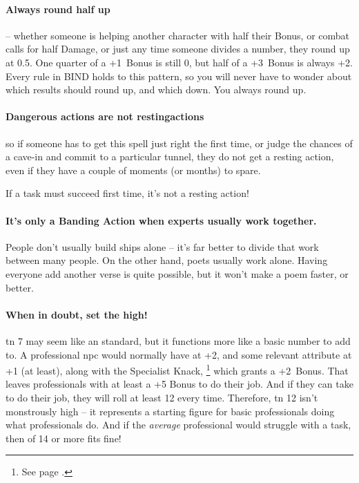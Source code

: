 \begin{multicols}{2}
\begin{scriptsize}
\begin{boxtable}[clXX]
\end{boxtable}
\end{scriptsize}

\paragraph{Always round half up} -- whether someone is helping another character with half their Bonus, or combat calls for half Damage, or just any time someone divides a number, they round up at 0.5.
One quarter of a +1~Bonus is still 0, but half of a +3~Bonus is always +2.
Every rule in BIND holds to this pattern, so you will never have to wonder about which results should round up, and which down.
You always round up.

\paragraph{Dangerous actions are not \glspl{restingaction}}
so if someone has to get this spell just right the first time, or judge the chances of a cave-in and commit to a particular tunnel, they do not get a resting action, even if they have a couple of moments (or months) to spare.

If a task must succeed first time, it's not a resting action!

\paragraph{It's only a Banding Action when experts usually work together.}
People don't usually build ships alone -- it's far better to divide that work between many people.
On the other hand, poets usually work alone.
Having everyone add another verse is quite possible, but it won't make a poem faster, or better.

\paragraph{When in doubt, set the  high!}
\Gls{tn} 7 may seem like an standard, but it functions more like a basic number to add to.
A professional \gls{npc} would normally have  at +2, and some relevant \gls{attribute} at +1 (at least), along with the Specialist Knack,%
\footnote{See page \pageref{specialist}.}
which grants a +2~Bonus.
That leaves professionals with at least a +5 Bonus to do their job.
And if they can take  to do their job, they will roll at least 12 every time.
Therefore, \gls{tn} 12 isn't monstrously high -- it represents a starting figure for basic professionals doing what professionals do.
And if the \emph{average} professional would struggle with a task, then  of 14 or more fits fine!


\end{multicols}
